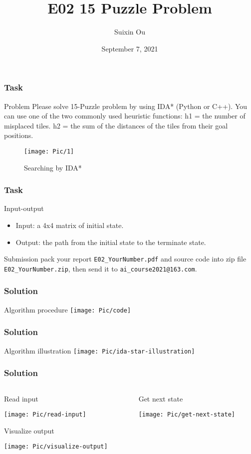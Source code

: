 \documentclass{beamer}
\title{E02 15 Puzzle Problem}
\author{Suixin Ou} %
\institute[SYSU] %
{
  School of Computer Science\\
  Sun Yat-sen University \\ %
  \medskip
}
\date{September 7, 2021} %
\begin{document}
\begin{frame}
  \titlepage
\end{frame}

\begin{frame}
  \frametitle{Task}
  \begin{block}{Problem}
    Please solve 15-Puzzle problem by using IDA* (Python or C++). You can use one of the two commonly used heuristic functions: h1 = the number of misplaced tiles. h2 = the sum of the distances of the tiles from their goal positions. 
    \begin{figure}[ht]
      \centering
      \texttt{[image: Pic/1]}
      \caption{Searching by IDA*}
    \end{figure}
  \end{block}
\end{frame}


\begin{frame}
  \frametitle{Task}
  \begin{block}{Input-output}
    \begin{itemize}
      \item Input: a 4x4 matrix of initial state.
      \item Output: the path from the initial state to the terminate state.
    \end{itemize}
  \end{block}
  \begin{block}{Submission}
    pack your report \texttt{E02\_YourNumber.pdf} and source code into zip file \texttt{E02\_YourNumber.zip}, then send it to \texttt{ai\_course2021@163.com}.
  \end{block}
\end{frame}

\begin{frame}
  \frametitle{Solution}
  Algorithm procedure
  \texttt{[image: Pic/code]}
\end{frame}

\begin{frame}
  \frametitle{Solution}
  Algorithm illustration
  \texttt{[image: Pic/ida-star-illustration]}
\end{frame}


\begin{frame}
  \frametitle{Solution}
  \begin{columns}
    \begin{column}{.5\linewidth}
      Read input
      
      \texttt{[image: Pic/read-input]}

      Visualize output
      
      \texttt{[image: Pic/visualize-output]}
    \end{column}
    \begin{column}{.5\linewidth}
      Get next state
      
      \texttt{[image: Pic/get-next-state]}
    \end{column}
  \end{columns}

\end{frame}
\end{document}
